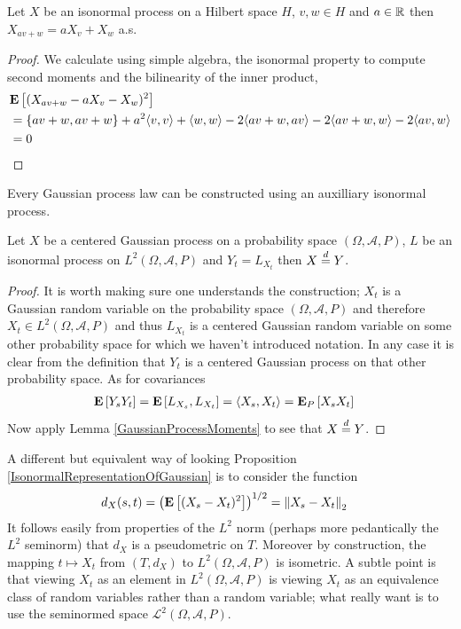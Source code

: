 \begin{prop}\label{LinearityIsonormalProcess} Let $X$ be an isonormal process on a Hilbert space $H$, $v, w \in H$ and $a \in \reals$ then $X_{av + w} = a X_v + X_w$ a.s. 
\end{prop}
\begin{proof}
We calculate using simple algebra, the isonormal property to compute second moments and the bilinearity of the inner product,
\begin{align*}
&\expectation{(X_{av + w} - a X_v - X_w)^2} \\ 
&= \lbrace av + w, av + w \rbrace + a^2 \langle v,v \rangle + \langle w, w \rangle - 2 \langle av + w, av \rangle - 2 \langle av + w, w \rangle - 2 \langle av, w \rangle \\
&= 0
\end{align*}
\end{proof}

Every Gaussian process law can be constructed using an auxilliary isonormal process.
\begin{prop}\label{IsonormalRepresentationOfGaussian} Let $X$ be a centered Gaussian process on a probability space $(\Omega, \mathcal{A}, P)$, $L$ be an isonormal process on $L^2(\Omega, \mathcal{A}, P)$ and $Y_t = L_{X_t}$ then $X \eqdist Y$.
\end{prop}
\begin{proof}
It is worth making sure one understands the construction; $X_t$ is a Gaussian random variable on the probability space $(\Omega, \mathcal{A}, P)$ and therefore $X_t \in L^2(\Omega, \mathcal{A}, P)$ and thus $L_{X_t}$ is a centered Gaussian random variable on some other probability space for which we haven't introduced notation.  In any case it is clear from the definition that $Y_t$ is a centered Gaussian process on that other probability space.  As for covariances
\begin{align*}
\expectation{Y_s Y_t} &= \expectation{L_{X_s}, L_{X_t}} = \langle X_s, X_t \rangle = \sexpectation{X_s X_t}{P}
\end{align*}
Now apply Lemma \ref{GaussianProcessMoments} to see that $X \eqdist Y$.
\end{proof}

A different but equivalent way of looking Proposition \ref{IsonormalRepresentationOfGaussian} is to consider the function 
\begin{align*}
d_X(s,t) &= \left( \expectation{(X_s - X_t)^2} \right)^{1/2} = \norm{X_s - X_t}_2
\end{align*}
It follows easily from properties of the $L^2$ norm (perhaps more pedantically the $L^2$ seminorm) that $d_X$ is a pseudometric on $T$.  Moreover by construction, the mapping $t \mapsto X_t$ from $(T,d_X)$ to $L^2(\Omega, \mathcal{A}, P)$ is isometric.  A subtle point is that viewing $X_t$ as an element in $L^2(\Omega, \mathcal{A}, P)$ is viewing $X_t$ as an equivalence class of random variables rather than a random variable; what really want is to use the seminormed space $\mathcal{L}^2(\Omega, \mathcal{A}, P)$.

